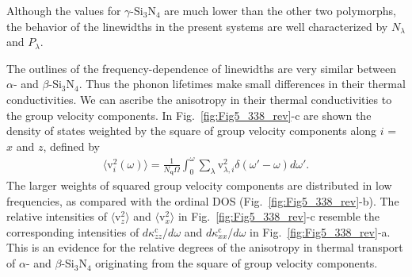 \documentclass[twocolumn,amsmath,amssymb,a4paper,prb,superscriptaddress,floatfix]{revtex4-1}
\begin{document}
Although the values for $\gamma$-Si$_3$N$_4$ are much lower
than the other two polymorphs, the behavior of the linewidths in the present
systems are well characterized by $N_\lambda$ and $P_\lambda$. 

The  outlines of the frequency-dependence of linewidths are very similar between
$\alpha$- and $\beta$-Si$_3$N$_4$.
Thus the phonon lifetimes make small differences in their thermal conductivities. 
We can ascribe the anisotropy in their thermal conductivities to the group
velocity components. In Fig.~\ref{fig:Fig5_338_rev}-c are shown the density of
states weighted by the square of group velocity components along $i$ = $x$ and
$z$, defined by 
\begin{align}
 \label{eq:v2dos}
 \langle\text{v}^2_i(\omega)\rangle = \frac{1}{N_\mathbf{q}\Omega}
 \int_0^\omega \sum_\lambda
 \text{v}_{\lambda,i}^2\delta(\omega'-\omega)d\omega'.
\end{align}
The larger weights of squared group velocity components are distributed in low
frequencies, as compared with the ordinal DOS (Fig.~\ref{fig:Fig5_338_rev}-b).
The relative intensities of $\langle\text{v}^2_z\rangle$ and
$\langle\text{v}^2_x\rangle$ in Fig.~\ref{fig:Fig5_338_rev}-c resemble the
corresponding intensities of $d\kappa^\text{c}_{zz}/d\omega$ and
$d\kappa^\text{c}_{xx}/d\omega$ in Fig.~\ref{fig:Fig5_338_rev}-a. This is an
evidence for the relative degrees of the anisotropy in thermal transport of
$\alpha$- and $\beta$-Si$_3$N$_4$ originating from the square of group velocity
components.
\end{document}

